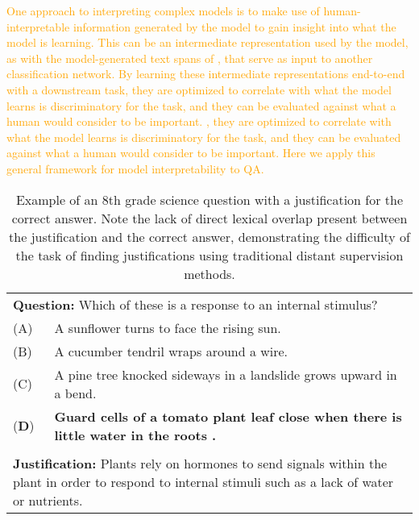 \textcolor{orange}{One approach to interpreting complex models is to make use of human-interpretable information %
 generated by the model to gain insight into what the model is learning.  This can be an intermediate representation used by the model, as with the model-generated text spans of \citet{Lei2016RationalizingNP}, that serve as input to another classification network.  
By learning these intermediate representations end-to-end with a downstream task, they are optimized to correlate with what the model learns is discriminatory for the task, and they can be evaluated against what a human would consider to be important.
, they are optimized to correlate with what the model learns is discriminatory for the task, and they can be evaluated against what a human would consider to be important.
Here we apply this general framework for model interpretability to QA.}


\begin{table}[t]
\begin{center}
\begin{tabularx}{\linewidth}{p{1cm}p{13cm}}
\multicolumn{2}{p{15cm}}{\textbf{Question:} Which of these is a response to an internal stimulus?} \\
 (A) & A sunflower turns to face the rising sun. \\
 (B) & A cucumber tendril wraps around a wire. \\
 (C) &  A pine tree knocked sideways in a landslide grows upward in a bend. \\
 (\textbf{D}) &\textbf{Guard cells of a tomato plant leaf close when there is little water in the roots .} \\
\\
\multicolumn{2}{p{15cm}}{\textbf{Justification:} 
Plants rely on hormones to send signals within the plant in order to respond to internal stimuli such as a lack of water or nutrients. } \\
\end{tabularx}

\caption{{  Example of an 8th grade science question with a justification for the correct answer.  Note the lack of direct lexical overlap present between the justification and the correct answer, demonstrating the difficulty of the task of finding justifications using traditional distant supervision methods. }}

\label{tab:question_example}
\end{center}
\end{table}


